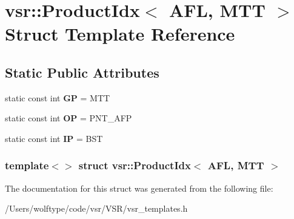 \hypertarget{structvsr_1_1_product_idx_3_01_a_f_l_00_01_m_t_t_01_4}{\section{vsr\-:\-:Product\-Idx$<$ A\-F\-L, M\-T\-T $>$ Struct Template Reference}
\label{structvsr_1_1_product_idx_3_01_a_f_l_00_01_m_t_t_01_4}
}
\subsection*{Static Public Attributes}
\begin{DoxyCompactItemize}
\item 
\hypertarget{structvsr_1_1_product_idx_3_01_a_f_l_00_01_m_t_t_01_4_ac5fe0b3c1a8e2d96453b4062bc75b052}{static const int {\bfseries G\-P} = M\-T\-T}\label{structvsr_1_1_product_idx_3_01_a_f_l_00_01_m_t_t_01_4_ac5fe0b3c1a8e2d96453b4062bc75b052}

\item 
\hypertarget{structvsr_1_1_product_idx_3_01_a_f_l_00_01_m_t_t_01_4_a622142bcea61a7bb6e189ca3f1540643}{static const int {\bfseries O\-P} = P\-N\-T\-\_\-\-A\-F\-P}\label{structvsr_1_1_product_idx_3_01_a_f_l_00_01_m_t_t_01_4_a622142bcea61a7bb6e189ca3f1540643}

\item 
\hypertarget{structvsr_1_1_product_idx_3_01_a_f_l_00_01_m_t_t_01_4_ac88e36d7e812b316bc940003ba14a8d5}{static const int {\bfseries I\-P} = B\-S\-T}\label{structvsr_1_1_product_idx_3_01_a_f_l_00_01_m_t_t_01_4_ac88e36d7e812b316bc940003ba14a8d5}

\end{DoxyCompactItemize}
\subsubsection*{template$<$$>$ struct vsr\-::\-Product\-Idx$<$ A\-F\-L, M\-T\-T $>$}



The documentation for this struct was generated from the following file\-:\begin{DoxyCompactItemize}
\item 
/\-Users/wolftype/code/vsr/\-V\-S\-R/vsr\-\_\-templates.\-h\end{DoxyCompactItemize}
